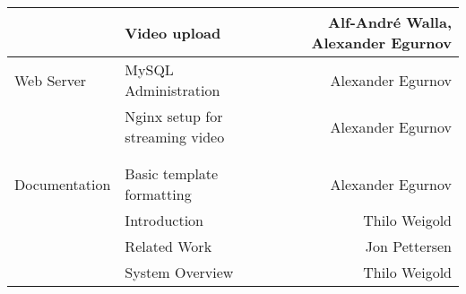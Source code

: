 \documentclass[conference]{IEEEtran}
\begin{document}
\begin{table*}[t]
\begin{tabular}{lllr}
			& Video upload &       & Alf-André Walla, Alexander Egurnov \\
		\midrule
			Web Server 
			& MySQL Administration &       & Alexander Egurnov \\
			& Nginx setup for streaming video &       & Alexander Egurnov \\
			&       &       &  \\
			&       &       &  \\
		\midrule
			Documentation & Basic template formatting & & Alexander Egurnov \\
			&       Introduction      & & Thilo Weigold \\
			&       Related Work      & & Jon Pettersen  \\
			&       System Overview   & & Thilo Weigold  \\
		\bottomrule
    \end{tabular}%
\end{table*}%
\hfill
\end{document}
